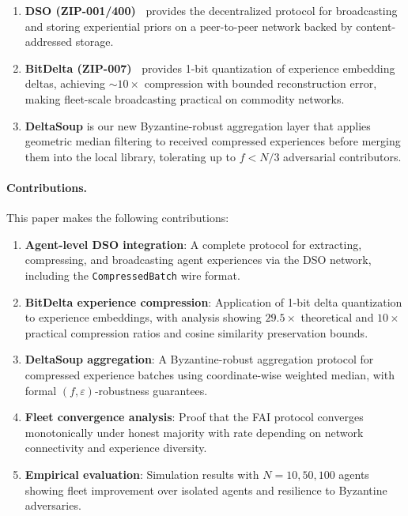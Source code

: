 \documentclass[11pt]{article}
\begin{document}
\begin{enumerate}[leftmargin=1.5em]
    \item \textbf{DSO (ZIP-001/400)~\cite{hanzo2026dso}} provides the
          decentralized protocol for broadcasting and storing experiential
          priors on a peer-to-peer network backed by content-addressed storage.
    \item \textbf{BitDelta (ZIP-007)~\cite{hanzo2026bitdelta}} provides 1-bit
          quantization of experience embedding deltas, achieving ${\sim}10\times$
          compression with bounded reconstruction error, making fleet-scale
          broadcasting practical on commodity networks.
    \item \textbf{DeltaSoup} is our new Byzantine-robust aggregation layer
          that applies geometric median filtering to received compressed
          experiences before merging them into the local library, tolerating
          up to $f < N/3$ adversarial contributors.
\end{enumerate}

\paragraph{Contributions.}
This paper makes the following contributions:
\begin{enumerate}[leftmargin=1.5em]
    \item \textbf{Agent-level DSO integration}: A complete protocol for
          extracting, compressing, and broadcasting agent experiences via the
          DSO network, including the \texttt{CompressedBatch} wire format.
    \item \textbf{BitDelta experience compression}: Application of 1-bit delta
          quantization to experience embeddings, with analysis showing
          $29.5\times$ theoretical and $10\times$ practical compression ratios
          and cosine similarity preservation bounds.
    \item \textbf{DeltaSoup aggregation}: A Byzantine-robust aggregation
          protocol for compressed experience batches using coordinate-wise
          weighted median, with formal $(f,\varepsilon)$-robustness guarantees.
    \item \textbf{Fleet convergence analysis}: Proof that the FAI protocol
          converges monotonically under honest majority with rate depending on
          network connectivity and experience diversity.
    \item \textbf{Empirical evaluation}: Simulation results with $N=10, 50, 100$
          agents showing fleet improvement over isolated agents and resilience to
          Byzantine adversaries.
\end{enumerate}
\end{document}
